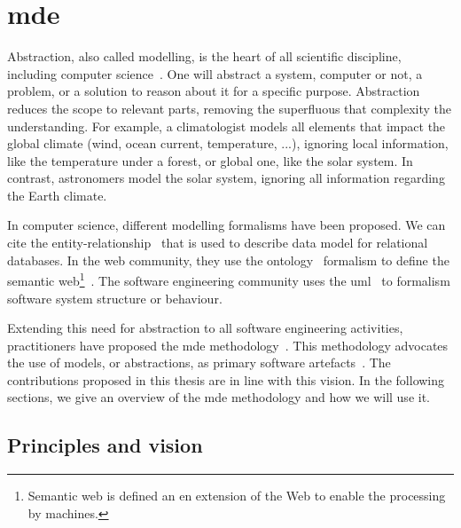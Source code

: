 \section[Model-Driven Engineering]{\glsdesc{mde}}

Abstraction, also called modelling, is the heart of all scientific discipline, including computer science~\cite{DBLP:journals/cacm/Kramer07}.
One will abstract a system, computer or not, a problem, or a solution to reason about it for a specific purpose.
Abstraction reduces the scope to relevant parts, removing the superfluous that complexity the understanding.
For example, a climatologist models all elements that impact the global climate (wind, ocean current, temperature, ...), ignoring local information, like the temperature under a forest, or global one, like the solar system.
In contrast, astronomers model the solar system, ignoring all information regarding the Earth climate.

In computer science, different modelling formalisms have been proposed. 
We can cite the entity-relationship~\cite{DBLP:journals/tods/Chen76} that is used to describe data model for relational databases.
In the web community, they use the ontology~\cite{DBLP:journals/ijmms/Gruber95} formalism to define the semantic web\footnote{Semantic web is defined an en extension of the Web to enable the processing by machines.}~\cite{berners2001semantic}.
The software engineering community uses the \gls{uml}~\cite{omg2017umlspec} to formalism software system structure or behaviour.

Extending this need for abstraction to all software engineering activities, practitioners have proposed the \gls{mde} methodology~\cite{DBLP:journals/computer/Schmidt06,DBLP:conf/ifm/Kent02}.
This methodology advocates the use of models, or abstractions, as primary software artefacts~\cite{DBLP:journals/software/WhittleHR14}.
The contributions proposed in this thesis are in line with this vision.
In the following sections, we give an overview of the \gls{mde} methodology and how we will use it.


\subsection[Principles and vision]{Principles and vision}

